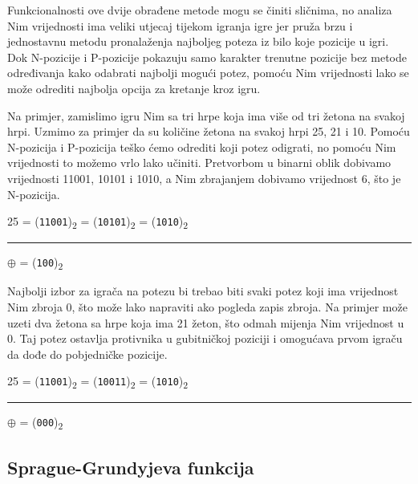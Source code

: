 Funkcionalnosti ove dvije obrađene metode mogu se činiti sličnima, no analiza Nim vrijednosti ima veliki utjecaj tijekom igranja igre jer pruža brzu i jednostavnu metodu pronalaženja najboljeg poteza iz bilo koje pozicije u igri. Dok N-pozicije i P-pozicije pokazuju samo karakter trenutne pozicije bez metode određivanja kako odabrati najbolji mogući potez, pomoću Nim vrijednosti lako se može odrediti najbolja opcija za kretanje kroz igru.

Na primjer, zamislimo igru Nim sa tri hrpe koja ima više od tri žetona na svakoj hrpi. Uzmimo za primjer da su količine žetona na svakoj hrpi 25, 21 i 10. Pomoću N-pozicija i P-pozicija teško ćemo odrediti koji potez odigrati, no pomoću Nim vrijednosti to možemo vrlo lako učiniti. Pretvorbom u binarni oblik dobivamo vrijednosti 11001, 10101 i 1010, a Nim zbrajanjem dobivamo vrijednost 6, što je N-pozicija.

\begin{center}
25 = (\texttt{11001})\textsubscript{2} = (\texttt{10101})\textsubscript{2} = (\texttt{1010})\textsubscript{2}\newline
\rule{2cm}{0.1pt}\newline
$\oplus$ = (\texttt{100})\textsubscript{2}\newline
\end{center}

Najbolji izbor za igrača na potezu bi trebao biti svaki potez koji ima vrijednost Nim zbroja 0, što može lako napraviti ako pogleda zapis zbroja. Na primjer može uzeti dva žetona sa hrpe koja ima 21 žeton, što odmah mijenja Nim vrijednost u 0. Taj potez ostavlja protivnika u gubitničkoj poziciji i omogućava prvom igraču da dođe do pobjedničke pozicije.

\begin{center}
25 = (\texttt{11001})\textsubscript{2} = (\texttt{10011})\textsubscript{2} = (\texttt{1010})\textsubscript{2}\newline
\rule{2cm}{0.1pt}\newline
$\oplus$ = (\texttt{000})\textsubscript{2}\newline
\end{center}


\subsection*{Sprague-Grundyjeva funkcija}

